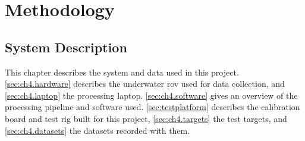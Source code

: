 %
%
\chapter{Methodology}
\label{ch:design}

\section{System Description}
This chapter describes the system and data used in this project.
\autoref{sec:ch4.hardware} describes the underwater \gls{rov} used for data collection, and \autoref{sec:ch4.laptop} the processing laptop.
\autoref{sec:ch4.software} gives an overview of the processing pipeline and software used.
\autoref{sec:testplatform} describes the calibration board and test rig built for this project, \autoref{sec:ch4.targets} the test targets,
and \autoref{sec:ch4.datasets} the datasets recorded with them.


